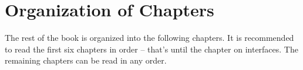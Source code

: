 





\section{Organization of Chapters}

The rest of the book is organized into the following chapters. It is recommended
to read the first six chapters in order -- that's until the chapter on
interfaces. The remaining chapters can be read in any order.

